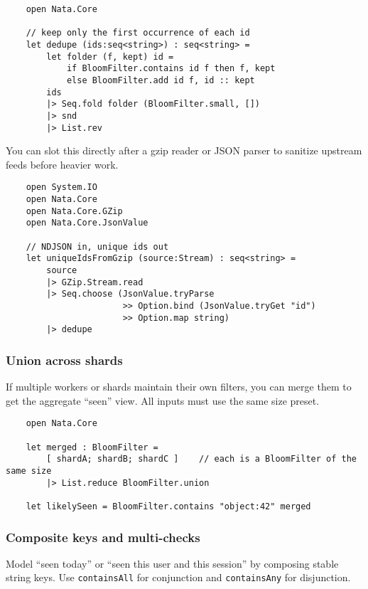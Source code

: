 \documentclass{article}
\begin{document}
\begin{verbatim}
    open Nata.Core

    // keep only the first occurrence of each id
    let dedupe (ids:seq<string>) : seq<string> =
        let folder (f, kept) id =
            if BloomFilter.contains id f then f, kept
            else BloomFilter.add id f, id :: kept
        ids
        |> Seq.fold folder (BloomFilter.small, [])
        |> snd
        |> List.rev
\end{verbatim}

You can slot this directly after a gzip reader or JSON parser to sanitize upstream feeds before heavier work.

\begin{verbatim}
    open System.IO
    open Nata.Core
    open Nata.Core.GZip
    open Nata.Core.JsonValue

    // NDJSON in, unique ids out
    let uniqueIdsFromGzip (source:Stream) : seq<string> =
        source
        |> GZip.Stream.read
        |> Seq.choose (JsonValue.tryParse
                       >> Option.bind (JsonValue.tryGet "id")
                       >> Option.map string)
        |> dedupe
\end{verbatim}

\subsubsection{Union across shards}
If multiple workers or shards maintain their own filters, you can merge them to get the aggregate “seen” view. All inputs must use the same size preset.

\begin{verbatim}
    open Nata.Core

    let merged : BloomFilter =
        [ shardA; shardB; shardC ]    // each is a BloomFilter of the same size
        |> List.reduce BloomFilter.union

    let likelySeen = BloomFilter.contains "object:42" merged
\end{verbatim}

\subsubsection{Composite keys and multi-checks}
Model “seen today” or “seen this user and this session” by composing stable string keys. Use \texttt{containsAll} for conjunction and \texttt{containsAny} for disjunction.
\end{document}
